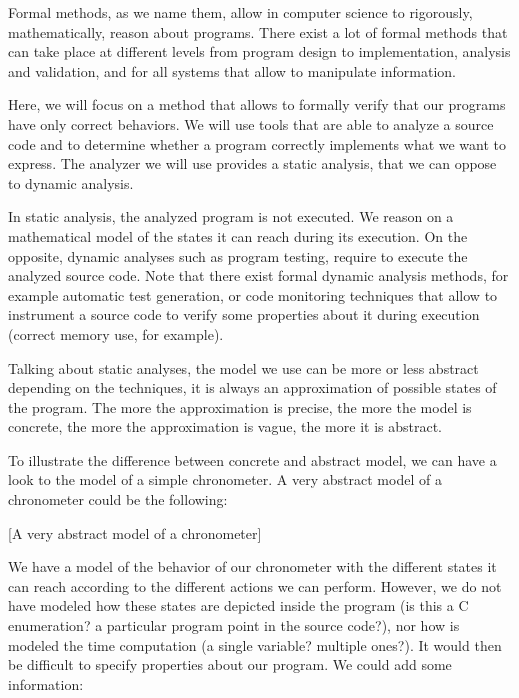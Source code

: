 Formal methods, as we name them, allow in computer science to
rigorously, mathematically, reason about programs. There exist a lot of
formal methods that can take place at different levels from program
design to implementation, analysis and validation, and for all systems
that allow to manipulate information.



Here, we will focus on a method that allows to formally verify that our
programs have only correct behaviors. We will use tools that are able to
analyze a source code and to determine whether a program correctly
implements what we want to express. The analyzer we will use provides a
static analysis, that we can oppose to dynamic analysis.



In static analysis, the analyzed program is not executed. We reason on a
mathematical model of the states it can reach during its execution. On
the opposite, dynamic analyses such as program testing, require to
execute the analyzed source code. Note that there exist formal dynamic
analysis methods, for example automatic test generation, or code
monitoring techniques that allow to instrument a source code to verify
some properties about it during execution (correct memory use, for
example).



Talking about static analyses, the model we use can be more or less
abstract depending on the techniques, it is always an approximation of
possible states of the program. The more the approximation is precise,
the more the model is concrete, the more the approximation is vague, the
more it is abstract.



To illustrate the difference between concrete and abstract model, we can
have a look to the model of a simple chronometer. A very abstract model of
a chronometer could be the following:



[A very abstract model of a chronometer]


We have a model of the behavior of our chronometer with the different
states it can reach according to the different actions we can perform.
However, we do not have modeled how these states are depicted inside the
program (is this a C enumeration? a particular program point in the
source code?), nor how is modeled the time computation (a single
variable? multiple ones?). It would then be difficult to specify
properties about our program. We could add some information:


